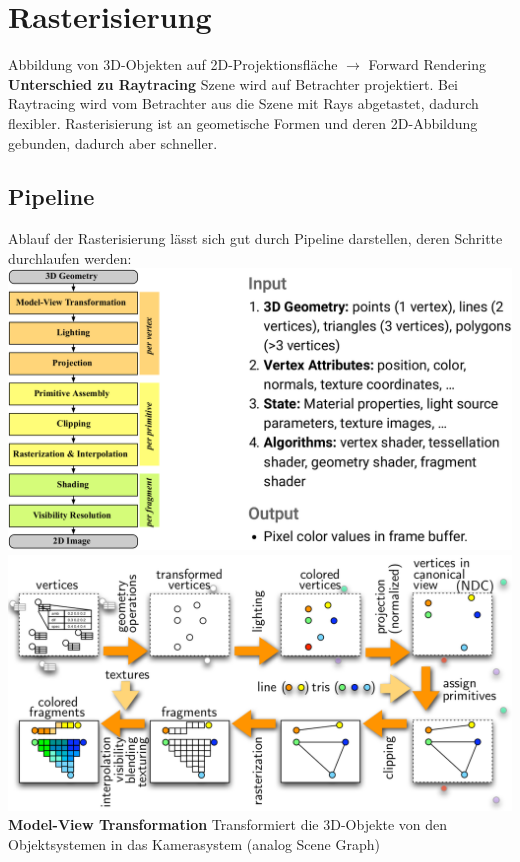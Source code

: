 \documentclass[12pt]{article}
\begin{document}
	\section{Rasterisierung}
	Abbildung von 3D-Objekten auf 2D-Projektionsfläche $\rightarrow$ Forward Rendering\\
	\textbf{Unterschied zu Raytracing} Szene wird auf Betrachter projektiert. Bei Raytracing wird vom Betrachter aus die Szene mit Rays abgetastet, dadurch flexibler. Rasterisierung ist an geometische Formen und deren 2D-Abbildung gebunden, dadurch aber schneller.
	
	\subsection{Pipeline}
	Ablauf der Rasterisierung lässt sich gut durch Pipeline darstellen, deren Schritte durchlaufen werden:\\
	\includegraphics[width=\linewidth]{figures/rasterization-pipeline.png}\\
	\includegraphics[width=\linewidth]{figures/rasterization-pipeline2.png}\\
	\textbf{Model-View Transformation} Transformiert die 3D-Objekte von den Objektsystemen in das Kamerasystem (analog Scene Graph)\\
\end{document}
